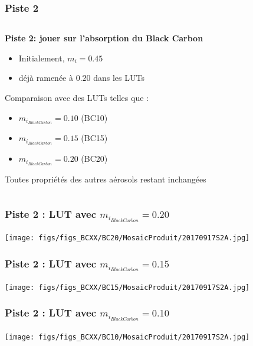 \documentclass[8pt]{beamer}
\begin{document}
\begin{frame}
\frametitle{Piste 2}
	\begin{columns}
		
		\begin{column}{0.7\textwidth}
			\textbf{Piste 2: jouer sur l'absorption du Black Carbon}
			\begin{itemize}
				\item Initialement, $m_{i}=0.45$
				\item déjà ramenée à $0.20$ dans les LUTs
			\end{itemize}

			Comparaison avec des LUTs telles que :
			\begin{itemize}
				\item $m_{i_{Black Carbon}}=0.10$ (BC10)
				\item $m_{i_{Black Carbon}}=0.15$ (BC15)
				\item $m_{i_{Black Carbon}}=0.20$ (BC20)
			\end{itemize}
			
			Toutes propriétés des autres aérosols restant inchangées
				
		\end{column}
	\end{columns}
\end{frame}


\begin{frame}
\frametitle{Piste 2 : LUT avec $m_{i_{Black Carbon}} = 0.20$}
	\begin{center}
     	\texttt{[image: figs/figs\_BCXX/BC20/MosaicProduit/20170917S2A.jpg]}
    \end{center}		
\end{frame}

\begin{frame}
\frametitle{Piste 2 : LUT avec $m_{i_{Black Carbon}} = 0.15$}
	\begin{center}
     	\texttt{[image: figs/figs\_BCXX/BC15/MosaicProduit/20170917S2A.jpg]}
    \end{center}		
\end{frame}

\begin{frame}
\frametitle{Piste 2 : LUT avec $m_{i_{Black Carbon}} = 0.10$}
	\begin{center}
     	\texttt{[image: figs/figs\_BCXX/BC10/MosaicProduit/20170917S2A.jpg]}
    \end{center}		
\end{frame}
\end{document}

